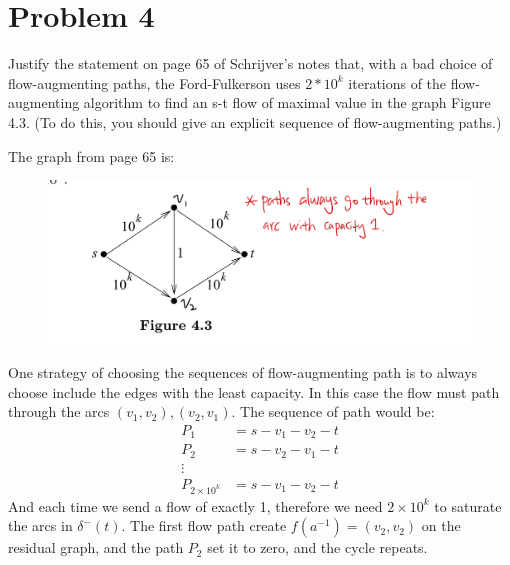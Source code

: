 \documentclass[]{article}
\theoremstyle{definition}
\begin{document}
\section{Problem 4}
    Justify the statement on page 65 of Schrijver's notes that, with a bad choice of flow-augmenting paths, the Ford-Fulkerson uses $2*10^k$ iterations of the flow-augmenting algorithm to find an s-t flow of maximal value in the graph Figure 4.3. (To do this, you should give an explicit sequence of flow-augmenting paths.)
    \par
    The graph from page 65 is: 
    \begin{figure}[h]
        \centering
        \includegraphics[width=12cm]{pathological.jpeg}
    \end{figure}
    \par
    One strategy of choosing the sequences of flow-augmenting path is to always choose include the edges with the least capacity. In this case the flow must path through the arcs $(v_1, v_2), (v_2, v_1)$. The sequence of path would be: 
    \begin{align}
        P_1 &= s-v_1-v_2-t
        \\
        P_2 &= s-v_2-v_1-t
        \\
        \vdots 
        \\
        P_{2\times 10^k} &= s-v_1-v_2-t
    \end{align}
    And each time we send a flow of exactly 1, therefore we need $2\times 10^k$ to saturate the arcs in $\delta^-(t)$. The first flow path create $f(a^{-1}) = (v_2, v_2)$ on the residual graph, and the path $P_2$ set it to zero, and the cycle repeats. 

        
        
\end{document}
